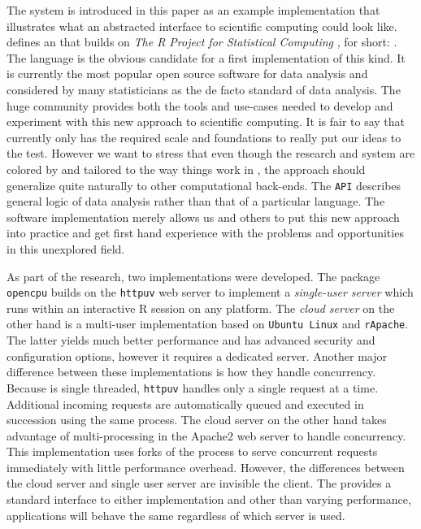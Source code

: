The \OpenCPU system is introduced in this paper as an example implementation that illustrates what an abstracted interface to scientific computing could look like. \OpenCPU defines an \HTTP \API that builds on \emph{The R Project for Statistical Computing} \citep{R}, for short: \R. The \R language is the obvious candidate for a first implementation of this kind. It is currently the most popular open source software for data analysis and considered by many statisticians as the de facto standard of data analysis. The huge \R community provides both the tools and use-cases needed to develop and experiment with this new approach to scientific computing. It is fair to say that currently only \R has the required scale and foundations to really put our ideas to the test. However we want to stress that even though the research and \OpenCPU system are colored by and tailored to the way things work in \R, the approach should generalize quite naturally to other computational back-ends. The \texttt{API} describes general logic of data analysis rather than that of a particular language. The software implementation merely allows us and others to put this new approach into practice and get first hand experience with the problems and opportunities in this unexplored field.

As part of the research, two \OpenCPU implementations were developed. The \R package \texttt{opencpu} builds on the \texttt{httpuv} web server \citep{httpuv} to implement a \emph{single-user server} which runs within an interactive R session on any platform. The \emph{cloud server} on the other hand is a multi-user implementation based on \texttt{Ubuntu Linux} and \texttt{rApache}. The latter yields much better performance and has advanced security and configuration options, however it requires a dedicated \Linux server. Another major difference between these implementations is how they handle concurrency. Because \R is single threaded, \texttt{httpuv} handles only a single request at a time. Additional incoming requests are automatically queued and executed in succession using the same process. The cloud server on the other hand takes advantage of multi-processing in the Apache2 web server to handle concurrency. This implementation uses forks of the \R process to serve concurrent requests immediately with little performance overhead. However, the differences between the cloud server and single user server are invisible the client. The \API provides a standard interface to either implementation and other than varying performance, applications will behave the same regardless of which server is used. 


